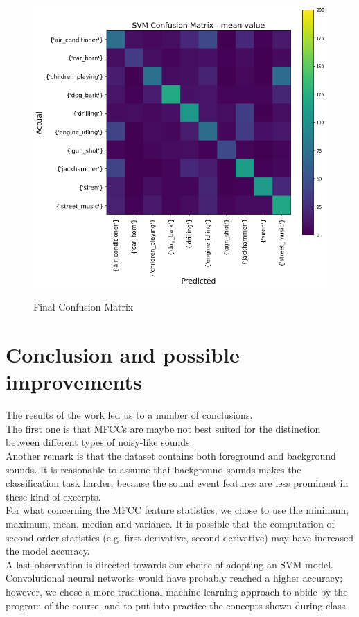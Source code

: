 \documentclass{article}
\begin{document}
\begin{figure}[h]
    \centering
    \caption{Final Confusion Matrix}
    \includegraphics[scale = 0.5]{img/final_confusion_matrix.png}
    \label{fig:mean_confusion_matrix}
\end{figure}

\section{Conclusion and possible improvements}
The results of the work led us to a number of conclusions.\\
The first one is that MFCCs are maybe not best suited for the distinction between different types of noisy-like sounds.\\
Another remark is that the dataset contains both foreground and background sounds. It is reasonable to assume that background sounds makes the classification task harder, because the sound event features are less prominent in these kind of excerpts.\\
For what concerning the MFCC feature statistics, we chose to use the minimum, maximum, mean, median and variance. It is possible that the computation of second-order statistics (e.g. first derivative, second derivative) may have increased the model accuracy.\\
A last observation is directed towards our choice of adopting an SVM model. Convolutional neural networks would have probably reached a higher accuracy; however, we chose a more traditional machine learning approach to abide by the program of the course, and to put into practice the concepts shown during class. 


\newpage


\end{document}
